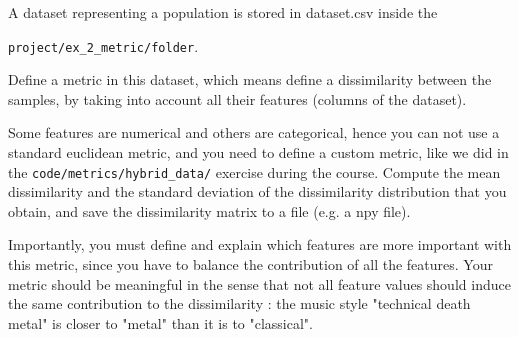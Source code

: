 \documentclass[10pt, a4paper]{article}
\begin{document}
\begin{Problem}
    A dataset representing a population is stored in dataset.csv inside the

    \verb|project/ex_2_metric/folder|.

    Define a metric in this dataset, which means define a dissimilarity between the samples, by taking into account all their features (columns of the dataset).

    Some features are numerical and others are categorical, hence you can not use a standard euclidean metric, and you need to define a custom metric, like we did in the \verb|code/metrics/hybrid_data/| exercise during the course. Compute the mean dissimilarity and the standard deviation of the dissimilarity distribution that you obtain, and save the dissimilarity matrix to a file (e.g. a npy file).

    Importantly, you must define and explain which features are more important with this metric, since you have to balance the contribution of all the features. Your metric should be meaningful in the sense that not all feature values should induce the same contribution to the dissimilarity : the music style "technical death metal" is closer to "metal" than it is to "classical".
\end{Problem}
\end{document}
